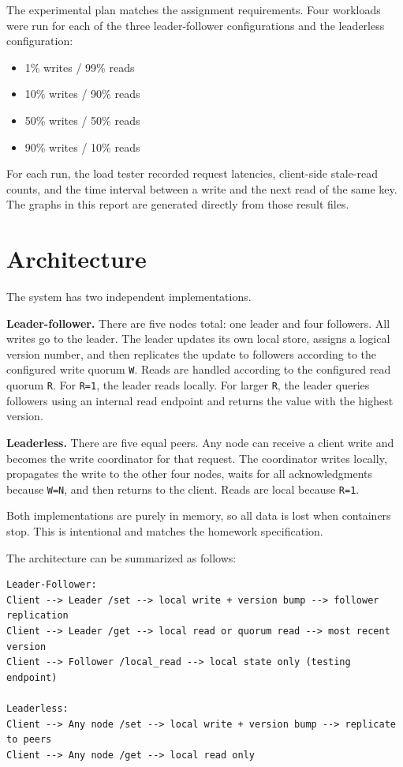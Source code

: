 \documentclass[11pt]{article}
\begin{document}
The experimental plan matches the assignment requirements. Four workloads were run for each of the three leader-follower configurations and the leaderless configuration:
\begin{itemize}
\item 1\% writes / 99\% reads
\item 10\% writes / 90\% reads
\item 50\% writes / 50\% reads
\item 90\% writes / 10\% reads
\end{itemize}

For each run, the load tester recorded request latencies, client-side stale-read counts, and the time interval between a write and the next read of the same key. The graphs in this report are generated directly from those result files.

\section{Architecture}

The system has two independent implementations.

\textbf{Leader-follower.} There are five nodes total: one leader and four followers. All writes go to the leader. The leader updates its own local store, assigns a logical version number, and then replicates the update to followers according to the configured write quorum \texttt{W}. Reads are handled according to the configured read quorum \texttt{R}. For \texttt{R=1}, the leader reads locally. For larger \texttt{R}, the leader queries followers using an internal read endpoint and returns the value with the highest version.

\textbf{Leaderless.} There are five equal peers. Any node can receive a client write and becomes the write coordinator for that request. The coordinator writes locally, propagates the write to the other four nodes, waits for all acknowledgments because \texttt{W=N}, and then returns to the client. Reads are local because \texttt{R=1}.

Both implementations are purely in memory, so all data is lost when containers stop. This is intentional and matches the homework specification.

The architecture can be summarized as follows:

\begin{verbatim}
Leader-Follower:
Client --> Leader /set --> local write + version bump --> follower replication
Client --> Leader /get --> local read or quorum read --> most recent version
Client --> Follower /local_read --> local state only (testing endpoint)

Leaderless:
Client --> Any node /set --> local write + version bump --> replicate to peers
Client --> Any node /get --> local read only
\end{verbatim}
\end{document}
